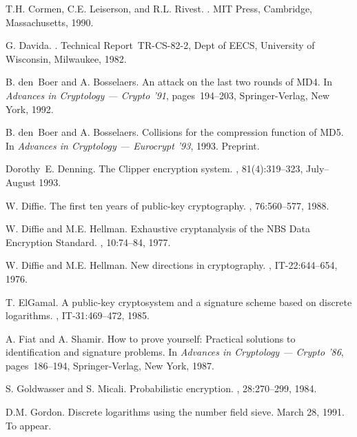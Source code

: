 \begin{thebibliography}{10}
T.H. Cormen, C.E. Leiserson, and R.L. Rivest.
.
\newblock MIT Press, Cambridge, Massachusetts, 1990.

G. Davida.
.
\newblock Technical Report~TR-CS-82-2, Dept of EECS, University of Wisconsin,
  Milwaukee, 1982.

B. den~Boer and A. Bosselaers.
\newblock An attack on the last two rounds of {MD}4.
\newblock In {\it Advances in Cryptology --- Crypto '91}, pages~194--203,
  Springer-Verlag, New York, 1992.

B. den~Boer and A. Bosselaers.
\newblock Collisions for the compression function of {MD5}.
\newblock In {\it Advances in Cryptology --- Eurocrypt '93}, 1993.
\newblock Preprint.

Dorothy~E. Denning.
\newblock The {Clipper} encryption system.
, 81(4):319--323, July--August 1993.

W. Diffie.
\newblock The first ten years of public-key cryptography.
, 76:560--577, 1988.

W. Diffie and M.E. Hellman.
\newblock Exhaustive cryptanalysis of the {NBS Data Encryption Standard}.
, 10:74--84, 1977.

W. Diffie and M.E. Hellman.
\newblock New directions in cryptography.
, IT-22:644--654, 1976.

T. ElGamal.
\newblock A public-key cryptosystem and a signature scheme based on discrete
  logarithms.
, IT-31:469--472, 1985.

A. Fiat and A. Shamir.
\newblock How to prove yourself: {Practical} solutions to identification and
  signature problems.
\newblock In {\it Advances in Cryptology --- Crypto '86}, pages~186--194,
  Springer-Verlag, New York, 1987.

S. Goldwasser and S. Micali.
\newblock Probabilistic encryption.
, 28:270--299, 1984.

D.M. Gordon.
\newblock Discrete logarithms using the number field sieve.
\newblock March 28, 1991.
\newblock To appear.


\end{thebibliography}
